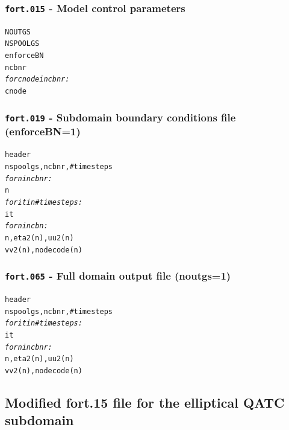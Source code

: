 \documentclass[11pt,titlepage]{article}
\begin{document}
\subsubsection{\texttt{fort.015} - Model control parameters}

\begin{alltt}
NOUTGS
NSPOOLGS
enforceBN
ncbnr
\emph{ for cnode in cbnr:}
\quad cnode


\end{alltt}


\subsubsection{\texttt{fort.019} - Subdomain boundary conditions file (enforceBN=1) }

\begin{alltt}
header
nspoolgs, ncbnr, #timesteps
\emph{for n in cbnr:}
\quad n
\emph{for it in #timesteps:}
\quad it
\quad \emph{for n in cbn:}
\quad \quad n, eta2(n), uu2(n)
\quad \quad vv2(n), nodecode(n)

\end{alltt}




\subsubsection{\texttt{fort.065} - Full domain output file (noutgs=1) }

\begin{alltt}
header
nspoolgs, ncbnr, #timesteps
\emph{for it in #timesteps:}
\quad it
\quad \emph{for n in cbnr:}
\quad \quad n, eta2(n), uu2(n)
\quad \quad vv2(n), nodecode(n)

\end{alltt}



\subsection{Modified fort.15 file for the elliptical QATC subdomain}
\end{document}
